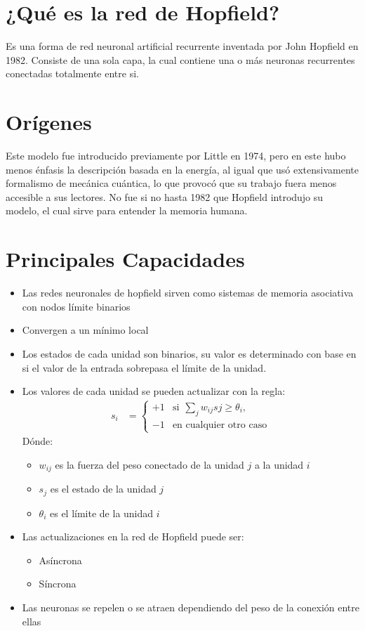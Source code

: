 \documentclass{article}
\author{Jorge Gómez Reus}
\date{}
\begin{document}
\maketitle
\tableofcontents
\section{¿Qué es la red de Hopfield?}
Es una forma de red neuronal artificial recurrente inventada por John Hopfield en 1982. Consiste de una sola capa, la cual contiene una o más neuronas recurrentes conectadas totalmente entre si.
\section{Orígenes}
Este modelo fue introducido previamente por Little en 1974, pero en este hubo menos énfasis la descripción basada en la energía, al igual que usó extensivamente formalismo de mecánica cuántica, lo que provocó que su trabajo fuera menos accesible a sus lectores. No fue si no hasta 1982 que Hopfield introdujo su modelo, el cual sirve para entender la memoria humana.
\section{Principales Capacidades}
\begin{itemize}
	\item Las redes neuronales de hopfield sirven como sistemas de memoria asociativa con nodos límite binarios
	\item Convergen a un mínimo local
	\item Los estados de cada unidad son binarios, su valor es determinado con base en si el valor de la entrada sobrepasa el límite de la unidad.
	\item Los valores de cada unidad se pueden actualizar con la regla:\\
	\begin{align}
		s_i & = 
		\begin{cases}
		+1 &  \text{si}\ \ \sum_{j}w_{ij}s{j} \ge \theta_i,\\
		-1 & \text{en cualquier otro caso}
		\end{cases}
	\end{align} 
	Dónde:
	\begin{itemize}
		\item $w_{ij}$ es la fuerza del peso conectado de la unidad $j$ a la unidad $i$
		\item $s_j$ es el estado de la unidad $j$
		\item $\theta_i$ es el límite de la unidad $i$
	\end{itemize}	
	\item Las actualizaciones en la red de Hopfield puede ser:
	\begin{itemize}
		\item Asíncrona
		\item Síncrona
	\end{itemize}
	\item Las neuronas se repelen o se atraen dependiendo del peso de la conexión entre ellas
\end{itemize}
\end{document}
